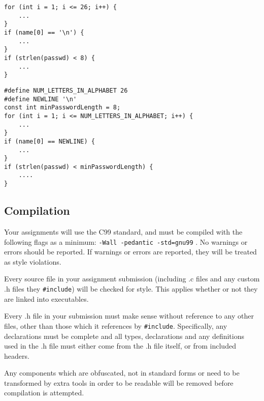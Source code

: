 \documentclass{article}
\begin{document}
\begin{minipage}{0.32\linewidth}
\begin{lstlisting}
for (int i = 1; i <= 26; i++) {
    ...
}
if (name[0] == '\n') {
    ...
}
if (strlen(passwd) < 8) {
    ...
}
\end{lstlisting}
\end{minipage}
\begin{minipage}{0.05\linewidth}
\hspace{0.2cm}
\end{minipage}
\begin{minipage}{0.55\linewidth}

\begin{lstlisting}
#define NUM_LETTERS_IN_ALPHABET 26
#define NEWLINE '\n'
const int minPasswordLength = 8;
for (int i = 1; i <= NUM_LETTERS_IN_ALPHABET; i++) {
    ...
}
if (name[0] == NEWLINE) {
    ...
}
if (strlen(passwd) < minPasswordLength) {
    ....
}
\end{lstlisting}
\end{minipage}

\linenumbers
\subsection{Compilation}
Your assignments will use the C99 standard, and must be compiled with the following flags as a minimum: \texttt{-Wall -pedantic -std=gnu99} .
No warnings or errors should be reported.
If warnings or errors are reported, they will be treated as style violations.

Every source file in your assignment submission (including .c files and any custom .h files they \texttt{\#include}) will be checked for style.
This applies whether or not they are linked into executables.

Every .h file in your submission must make sense without reference to any other files, other than those which it references by \texttt{\#include}.
Specifically, any declarations must be complete and all types, declarations and any definitions used in the .h file must either come from the .h file itself, or from included headers.

Any components which are obfuscated, not in standard forms or need to be transformed by extra tools in order to be readable will be removed before compilation is attempted.
\end{document}

